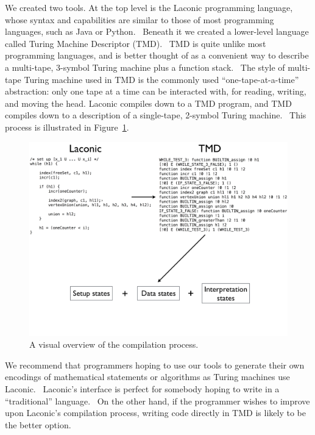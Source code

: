 \documentclass[11pt]{article}
\begin{document}
We created two tools. At the top level is the Laconic programming language, whose syntax and capabilities are similar to those of most programming languages, such as Java or Python. \ Beneath it we created a lower-level language called Turing Machine Descriptor (TMD). \ TMD is quite unlike most programming languages, and is better thought of as a convenient way to describe a multi-tape, 3-symbol Turing machine plus a function stack. \ The style of multi-tape Turing machine used in TMD is the commonly used ``one-tape-at-a-time'' abstraction: only one tape at a time can be interacted with, for reading, writing, and moving the head. Laconic compiles down to a TMD program, and TMD compiles down to a description of a single-tape, 2-symbol Turing machine. \ This process is illustrated in Figure~\ref{fig:compilation}.

\begin{figure}
\begin{center}
\includegraphics[scale=0.42]{figs/compilation.png}
\caption{A visual overview of the compilation process. \label{fig:compilation}}
\end{center}
\end{figure}

We recommend that programmers hoping to use our tools to generate their own encodings of mathematical statements or algorithms as Turing machines use Laconic. \ Laconic's interface is perfect for somebody hoping to write in a ``traditional'' language. \ On the other hand, if the programmer wishes to improve upon Laconic's compilation process, writing code directly in TMD is likely to be the better option.
\end{document}
